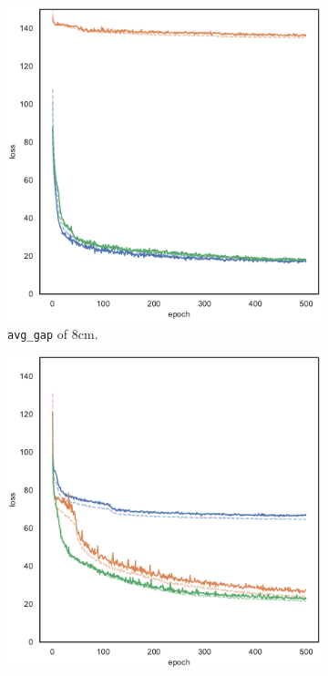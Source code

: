 \begin{figure}[!htb]
	\begin{center}
		\begin{subfigure}[h]{0.32\textwidth}
			\includegraphics[width=\textwidth]{contents/images/task1-comm/loss-communication-gap_8@copy}%
			\caption{\texttt{avg\_gap} of $8$\gls{cm}.}
		\end{subfigure}
		\hfill
		\begin{subfigure}[h]{0.32\textwidth}
			\includegraphics[width=\textwidth]{contents/images/task1-comm/loss-communication-gap_13@copy}%

\end{subfigure}
\end{center}
\end{figure}
